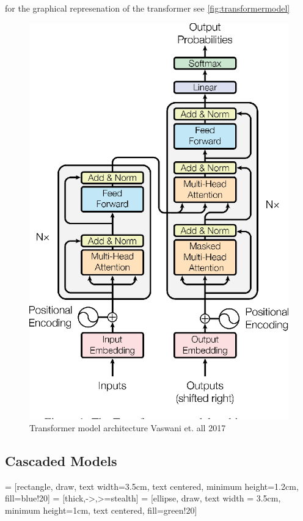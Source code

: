 for the graphical represenation of the transformer see \autoref{fig:transformermodel}
\begin{figure}
        \centering%
        \includegraphics[width=0.5\linewidth]{Latex//sections//images/transformermodel.png}
        \caption{Transformer model architecture Vaswani et. all 2017}
        \label{fig:transformermodel}
    \end{figure}



\subsection{Cascaded Models}
 = [rectangle, draw, text width=3.5cm, text centered, minimum height=1.2cm, fill=blue!20]
 = [thick,->,>=stealth]
 = [ellipse, draw, text width = 3.5cm, minimum height=1cm, text centered, fill=green!20]

